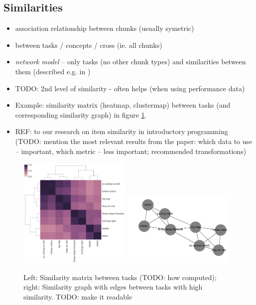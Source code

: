 \subsection{Similarities}

\begin{itemize}
\item association relationship between chunks (usually symetric)
\item between tasks / concepts / cross (ie. all chunks)
\item \emph{network model} -- only tasks (no other chunk types) and similarities
  between them (described e.g. in \cite{rihak-phd})
\item TODO: 2nd level of similarity - often helps (when using performance data) \cite{rihak-phd}
\item Example: similarity matrix (heatmap, clustermap) between tasks
  (and corresponding similarity graph) in figure \ref{fig:similarities-tasks}.
\item REF: to our research on item similarity in introductory programming
  (TODO: mention the most relevant results from the paper:
   which data to use -- important, which metric -- less important; recommended transformations)
\end{itemize}

\begin{figure}[htb]
\begin{center}
  \includegraphics[width=0.48\textwidth]{img/similarities-tasks}
  \includegraphics[width=0.48\textwidth]{img/similarities-graph}
\end{center}
\caption{%
  Left: Similarity matrix between tasks (TODO: how computed);
  right: Similarity graph with edges between tasks with high similarity.
  TODO: make it readable}
\label{fig:similarities-tasks}
\end{figure}

